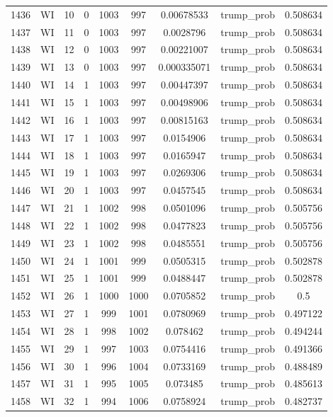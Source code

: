 \documentclass[12pt,a4paper]{article}
\begin{document}
\begin{tabular}{r|cccccccc}
	1436 & WI & 10 & 0 & 1003 & 997 & 0.00678533 & trump\_prob & 0.508634 \\
	1437 & WI & 11 & 0 & 1003 & 997 & 0.0028796 & trump\_prob & 0.508634 \\
	1438 & WI & 12 & 0 & 1003 & 997 & 0.00221007 & trump\_prob & 0.508634 \\
	1439 & WI & 13 & 0 & 1003 & 997 & 0.000335071 & trump\_prob & 0.508634 \\
	1440 & WI & 14 & 1 & 1003 & 997 & 0.00447397 & trump\_prob & 0.508634 \\
	1441 & WI & 15 & 1 & 1003 & 997 & 0.00498906 & trump\_prob & 0.508634 \\
	1442 & WI & 16 & 1 & 1003 & 997 & 0.00815163 & trump\_prob & 0.508634 \\
	1443 & WI & 17 & 1 & 1003 & 997 & 0.0154906 & trump\_prob & 0.508634 \\
	1444 & WI & 18 & 1 & 1003 & 997 & 0.0165947 & trump\_prob & 0.508634 \\
	1445 & WI & 19 & 1 & 1003 & 997 & 0.0269306 & trump\_prob & 0.508634 \\
	1446 & WI & 20 & 1 & 1003 & 997 & 0.0457545 & trump\_prob & 0.508634 \\
	1447 & WI & 21 & 1 & 1002 & 998 & 0.0501096 & trump\_prob & 0.505756 \\
	1448 & WI & 22 & 1 & 1002 & 998 & 0.0477823 & trump\_prob & 0.505756 \\
	1449 & WI & 23 & 1 & 1002 & 998 & 0.0485551 & trump\_prob & 0.505756 \\
	1450 & WI & 24 & 1 & 1001 & 999 & 0.0505315 & trump\_prob & 0.502878 \\
	1451 & WI & 25 & 1 & 1001 & 999 & 0.0488447 & trump\_prob & 0.502878 \\
	1452 & WI & 26 & 1 & 1000 & 1000 & 0.0705852 & trump\_prob & 0.5 \\
	1453 & WI & 27 & 1 & 999 & 1001 & 0.0780969 & trump\_prob & 0.497122 \\
	1454 & WI & 28 & 1 & 998 & 1002 & 0.078462 & trump\_prob & 0.494244 \\
	1455 & WI & 29 & 1 & 997 & 1003 & 0.0754416 & trump\_prob & 0.491366 \\
	1456 & WI & 30 & 1 & 996 & 1004 & 0.0733169 & trump\_prob & 0.488489 \\
	1457 & WI & 31 & 1 & 995 & 1005 & 0.073485 & trump\_prob & 0.485613 \\
	1458 & WI & 32 & 1 & 994 & 1006 & 0.0758924 & trump\_prob & 0.482737 \\

\end{tabular}
\end{document}
